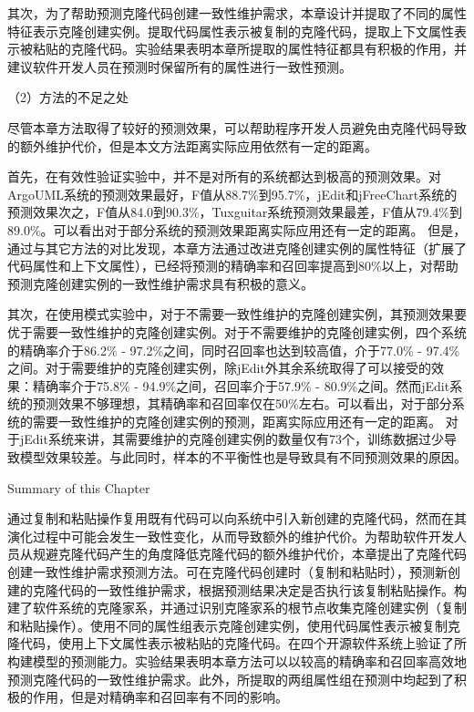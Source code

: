 
其次，为了帮助预测克隆代码创建一致性维护需求，本章设计并提取了不同的属性特征表示克隆创建实例。提取代码属性表示被复制的克隆代码，提取上下文属性表示被粘贴的克隆代码。实验结果表明本章所提取的属性特征都具有积极的作用，并建议软件开发人员在预测时保留所有的属性进行一致性预测。


（2）方法的不足之处

尽管本章方法取得了较好的预测效果，可以帮助程序开发人员避免由克隆代码导致的额外维护代价，但是本文方法距离实际应用依然有一定的距离。

首先，在有效性验证实验中，并不是对所有的系统都达到极高的预测效果。对ArgoUML系统的预测效果最好，F值从88.7\%到95.7\%，jEdit和jFreeChart系统的预测效果次之，F值从84.0到90.3\%，Tuxguitar系统预测效果最差，F值从79.4\%到89.0\%。可以看出对于部分系统的预测效果距离实际应用还有一定的距离。
但是，通过与其它方法的对比发现，本章方法通过改进克隆创建实例的属性特征（扩展了代码属性和上下文属性），已经将预测的精确率和召回率提高到80\%以上，对帮助预测克隆创建实例的一致性维护需求具有积极的意义。

其次，在使用模式实验中，对于不需要一致性维护的克隆创建实例，其预测效果要优于需要一致性维护的克隆创建实例。对于不需要维护的克隆创建实例，四个系统的精确率介于86.2\% - 97.2\%之间，同时召回率也达到较高值，介于77.0\% - 97.4\%之间。对于需要维护的克隆创建实例，除jEdit外其余系统取得了可以接受的效果：精确率介于75.8\% - 94.9\%之间，召回率介于57.9\% - 80.9\%之间。然而jEdit系统的预测效果不够理想，其精确率和召回率仅在50\%左右。可以看出，对于部分系统的需要一致性维护的克隆创建实例的预测，距离实际应用还有一定的距离。
对于jEdit系统来讲，其需要维护的克隆创建实例的数量仅有73个，训练数据过少导致模型效果较差。与此同时，样本的不平衡性也是导致具有不同预测效果的原因。



{Summary of this Chapter}

通过复制和粘贴操作复用既有代码可以向系统中引入新创建的克隆代码，然而在其演化过程中可能会发生一致性变化，从而导致额外的维护代价。为帮助软件开发人员从规避克隆代码产生的角度降低克隆代码的额外维护代价，本章提出了克隆代码创建一致性维护需求预测方法。可在克隆代码创建时（复制和粘贴时），预测新创建的克隆代码的一致性维护需求，根据预测结果决定是否执行该复制粘贴操作。构建了软件系统的克隆家系，并通过识别克隆家系的根节点收集克隆创建实例（复制和粘贴操作）。使用不同的属性组表示克隆创建实例，使用代码属性表示被复制克隆代码，使用上下文属性表示被粘贴的克隆代码。在四个开源软件系统上验证了所构建模型的预测能力。实验结果表明本章方法可以以较高的精确率和召回率高效地预测克隆代码的一致性维护需求。此外，所提取的两组属性组在预测中均起到了积极的作用，但是对精确率和召回率有不同的影响。
